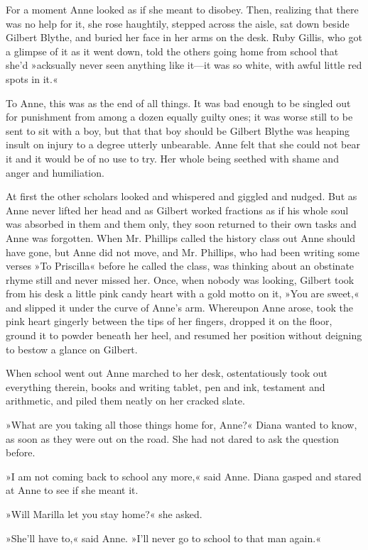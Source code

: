 For a moment Anne looked as if she meant to disobey. Then, realizing that there was no help for it, she rose haughtily, stepped across the aisle, sat down beside Gilbert Blythe, and buried her face in her arms on the desk. Ruby Gillis, who got a glimpse of it as it went down, told the others going home from school that she’d »acksually never seen anything like it—it was so white, with awful little red spots in it.«

To Anne, this was as the end of all things. It was bad enough to be singled out for punishment from among a dozen equally guilty ones; it was worse still to be sent to sit with a boy, but that that boy should be Gilbert Blythe was heaping insult on injury to a degree utterly unbearable. Anne felt that she could not bear it and it would be of no use to try. Her whole being seethed with shame and anger and humiliation.

At first the other scholars looked and whispered and giggled and nudged. But as Anne never lifted her head and as Gilbert worked fractions as if his whole soul was absorbed in them and them only, they soon returned to their own tasks and Anne was forgotten. When Mr. Phillips called the history class out Anne should have gone, but Anne did not move, and Mr. Phillips, who had been writing some verses »To Priscilla« before he called the class, was thinking about an obstinate rhyme still and never missed her. Once, when nobody was looking, Gilbert took from his desk a little pink candy heart with a gold motto on it, »You are sweet,« and slipped it under the curve of Anne’s arm. Whereupon Anne arose, took the pink heart gingerly between the tips of her fingers, dropped it on the floor, ground it to powder beneath her heel, and resumed her position without deigning to bestow a glance on Gilbert.

When school went out Anne marched to her desk, ostentatiously took out everything therein, books and writing tablet, pen and ink, testament and arithmetic, and piled them neatly on her cracked slate.

»What are you taking all those things home for, Anne?« Diana wanted to know, as soon as they were out on the road. She had not dared to ask the question before.

»I am not coming back to school any more,« said Anne. Diana gasped and stared at Anne to see if she meant it.

»Will Marilla let you stay home?« she asked.

»She’ll have to,« said Anne. »I’ll never go to school to that man again.«

